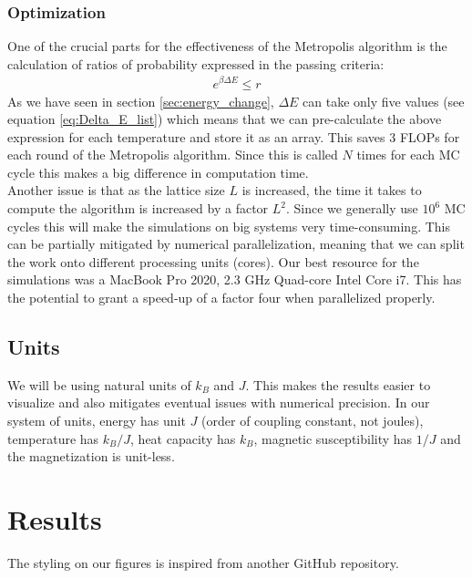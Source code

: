 \documentclass[%
 reprint,
nofootinbib,
aps,
]{revtex4-1}
\begin{document}
\subsubsection{Optimization}
One of the crucial parts for the effectiveness of the Metropolis algorithm is the calculation of ratios of probability expressed in the passing criteria:
\begin{align*}
    e^{\beta \Delta E} \leq r
\end{align*}
As we have seen in section \ref{sec:energy_change}, $\Delta E$ can take only five values (see equation \ref{eq:Delta_E_list}) which means that we can pre-calculate the above expression for each temperature and store it as an array. This saves 3 FLOPs for each round of the Metropolis algorithm. Since this is called $N$ times for each MC cycle this makes a big difference in computation time.\\
Another issue is that as the lattice size $L$ is increased, the time it takes to compute the algorithm is increased by a factor $L^2$. Since we generally use $10^6$ MC cycles this will make the simulations on big systems very time-consuming. This can be partially mitigated by numerical parallelization, meaning that we can split the work onto different processing units (cores). Our best resource for the simulations was a MacBook Pro 2020, 2.3 GHz Quad-core Intel Core i7. This has the potential to grant a speed-up of a factor four when parallelized properly. 


\subsection{Units}
We will be using natural units of $k_B$ and $J$. This makes the results easier to visualize and also mitigates eventual issues with numerical precision. In our system of units, energy has unit $J$ (order of coupling constant, not joules), temperature has $k_B/J$, heat capacity has $k_B$, magnetic susceptibility has $1/J$ and the magnetization is unit-less. 
\newpage
\section{Results}
The styling on our figures is inspired from another GitHub repository\cite{fig:style}.
\end{document}
